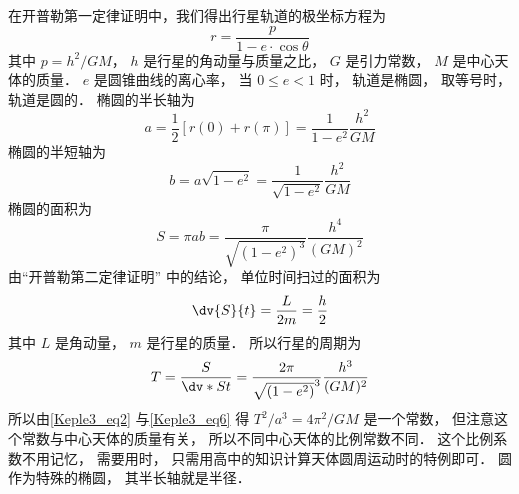

在开普勒第一定律证明中，我们得出行星轨道的极坐标方程为
\begin{equation}\label{Keple3_eq1}
  r = \frac{p}{{1 - e \cdot \cos \theta }}
\end{equation}
其中 $p = {h^2}/{GM}$，  $h$ 是行星的角动量与质量之比， $G$ 是引力常数， $M$ 是中心天体的质量． $e$ 是圆锥曲线的离心率， 当 $0 \le e < 1$ 时， 轨道是椭圆， 取等号时， 轨道是圆的． 椭圆的半长轴为
\begin{equation}\label{Keple3_eq2}
  a = \frac{1}{2}[r(0) + r(\pi)] = \frac{1}{{1 - {e^2}}}\frac{{{h^2}}}{{GM}}
\end{equation}
椭圆的半短轴为
\begin{equation}\label{Keple3_eq3}
  b = a\sqrt {1 - {e^2}}  = \frac{1}{{\sqrt {1 - {e^2}} }}\frac{{{h^2}}}{{GM}}
\end{equation}
椭圆的面积为
\begin{equation}\label{Keple3_eq4}
  S = \pi ab = \frac{\pi }{\sqrt{(1 - e^2)^3} }\frac{h^4}{(GM)^2}
\end{equation}
由“开普勒第二定律证明” 中的结论， 单位时间扫过的面积为
\begin{equation}\label{Keple3_eq5}
\dv{S}{t} = \frac{L}{2m} = \frac{h}{2}
\end{equation}
其中 $L$ 是角动量， $m$ 是行星的质量． 所以行星的周期为
\begin{equation}\label{Keple3_eq6}
  T = \frac{S}{\dv*{S}{t}} = \frac{2\pi}{\sqrt{(1 - e^2)}^3}\frac{h^3}{(GM)^2}
\end{equation}
所以由\autoref{Keple3_eq2} 与\autoref{Keple3_eq6} 得 $T^2/a^3 = 4\pi ^2/GM$ 是一个常数， 但注意这个常数与中心天体的质量有关， 所以不同中心天体的比例常数不同． 这个比例系数不用记忆， 需要用时， 只需用高中的知识计算天体圆周运动时的特例即可． 圆作为特殊的椭圆， 其半长轴就是半径．
